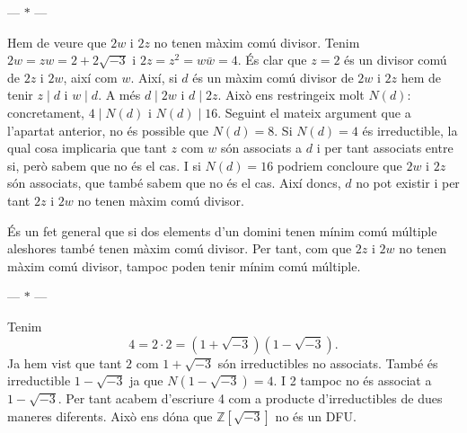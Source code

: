 \documentclass[12pt]{article}
\newcommand{\Z}{\mathbb{Z}}
\newcommand{\R}{\Z[\sqrt{-3}]}
\newcommand{\parbreak}{
	\begin{center}
		--- $\ast$ ---
	\end{center} 
}
\begin{document}
\parbreak

Hem de veure que \( 2w \) i \( 2z \) no tenen màxim comú divisor. Tenim \( 2w = zw = 2 + 2\sqrt{-3} \) i \( 2z = z^2 = w\bar{w} = 4 \). És clar que \( z = 2 \) és un divisor comú de \( 2z \) i \( 2w \), així com \( w \). Així, si \( d \) és un màxim comú divisor de \( 2w \) i \( 2z \) hem de tenir \( z \mid d \) i \( w \mid d \). A més \( d \mid 2w \) i \( d \mid 2z \). Això ens restringeix molt \( N(d) \): concretament, \( 4 \mid N(d) \) i \( N(d) \mid 16 \). Seguint el mateix argument que a l'apartat anterior, no és possible que \( N(d) = 8 \). Si \( N(d) = 4 \) és irreductible, la qual cosa implicaria que tant \( z \) com \( w \) són associats a \( d \) i per tant associats entre si, però sabem que no és el cas. I si \( N(d) = 16 \) podriem concloure que \( 2w \) i \( 2z \) són associats, que també sabem que no és el cas. Així doncs, \( d \) no pot existir i per tant \( 2z \) i \( 2w \) no tenen màxim comú divisor.   

És un fet general que si dos elements d'un domini tenen mínim comú múltiple aleshores també tenen màxim comú divisor. Per tant, com que \( 2z \) i \( 2w \) no tenen màxim comú divisor, tampoc poden tenir mínim comú múltiple.  

\parbreak

Tenim 
\begin{equation*}
	4 = 2 \cdot 2 = (1 + \sqrt{-3})(1 - \sqrt{-3}).
\end{equation*}
Ja hem vist que tant \( 2 \) com \( 1 + \sqrt{-3} \) són irreductibles no associats. També és irreductible \( 1 - \sqrt{-3} \) ja que \( N(1 - \sqrt{-3}) = 4 \). I 2 tampoc no és associat a \( 1 - \sqrt{-3} \). Per tant acabem d'escriure 4 com a producte d'irreductibles de dues maneres diferents. Això ens dóna que \( \R \) no és un DFU.    
\end{document}
